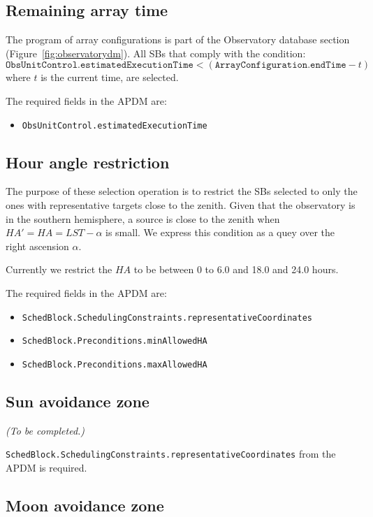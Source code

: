 \documentclass{article}
\begin{document}
\subsection{Remaining array time}

The program of array configurations is part of the Observatory database
section (Figure~\ref{fig:observatorydm}). All SBs that comply with the condition:
$$
\mathtt{ObsUnitControl.estimatedExecutionTime} < (\mathtt{ArrayConfiguration.endTime} - t)
$$
where $t$ is the current time, are selected.

The required fields in the APDM are:
\begin{itemize}
\item {\tt ObsUnitControl.estimatedExecutionTime}
\end{itemize}

\subsection{Hour angle restriction}

The purpose of these selection operation is to restrict the SBs selected to
only the ones with representative targets close to the zenith. Given that the observatory
is in the southern hemisphere, a source is close to the zenith when $HA' = HA = LST - \alpha$
is small. We express this condition as a quey over the right ascension $\alpha$.

Currently we restrict the $HA$ to be between 0 to 6.0 and 18.0 and 24.0 hours.

The required fields in the APDM are:
\begin{itemize}
\item {\tt SchedBlock.SchedulingConstraints.representativeCoordinates}
\item {\tt SchedBlock.Preconditions.minAllowedHA}
\item {\tt SchedBlock.Preconditions.maxAllowedHA}
\end{itemize}

\subsection{Sun avoidance zone}

{\em (To be completed.)}

{\tt SchedBlock.SchedulingConstraints.representativeCoordinates} from the APDM is required.

\subsection{Moon avoidance zone}
\end{document}
